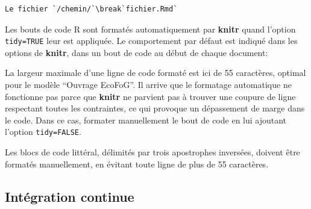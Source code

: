 \documentclass[
  11pt,
  french,
  a4paper,
  extrafontsizes,onecolumn,openright
  ]{memoir}
\newenvironment{Shaded}{\begin{snugshade}}{\end{snugshade}}
\newcommand{\AttributeTok}[1]{\textcolor[rgb]{0.77,0.63,0.00}{#1}}
\newcommand{\CommentTok}[1]{\textcolor[rgb]{0.56,0.35,0.01}{\textit{#1}}}
\newcommand{\ConstantTok}[1]{\textcolor[rgb]{0.00,0.00,0.00}{#1}}
\newcommand{\DecValTok}[1]{\textcolor[rgb]{0.00,0.00,0.81}{#1}}
\newcommand{\FunctionTok}[1]{\textcolor[rgb]{0.00,0.00,0.00}{#1}}
\newcommand{\NormalTok}[1]{#1}
\newcommand{\SpecialCharTok}[1]{\textcolor[rgb]{0.00,0.00,0.00}{#1}}
\newcommand{\StringTok}[1]{\textcolor[rgb]{0.31,0.60,0.02}{#1}}
\begin{document}
\begin{verbatim}
Le fichier `/chemin/`\break`fichier.Rmd`
\end{verbatim}

Les bouts de code R sont formatés automatiquement par \textbf{knitr} quand l'option \texttt{tidy=TRUE} leur est appliquée.
Le comportement par défaut est indiqué dans les options de \textbf{knitr}, dans un bout de code au début de chaque document:

\scriptsize

\begin{Shaded}
\end{Shaded}

\normalsize

La largeur maximale d'une ligne de code formaté est ici de 55 caractères, optimal pour le modèle ``Ouvrage EcoFoG''.
Il arrive que le formatage automatique ne fonctionne pas parce que \textbf{knitr} ne parvient pas à trouver une coupure de ligne respectant toutes les contraintes, ce qui provoque un dépassement de marge dans le code.
Dans ce cas, formater manuellement le bout de code en lui ajoutant l'option \texttt{tidy=FALSE}.

Les blocs de code littéral, délimités par trois apostrophes inversées, doivent être formatés manuellement, en évitant toute ligne de plus de 55 caractères.

\hypertarget{sec:rediger-ouvrage-ci}{%
\subsection{Intégration continue}\label{sec:rediger-ouvrage-ci}}
\end{document}
